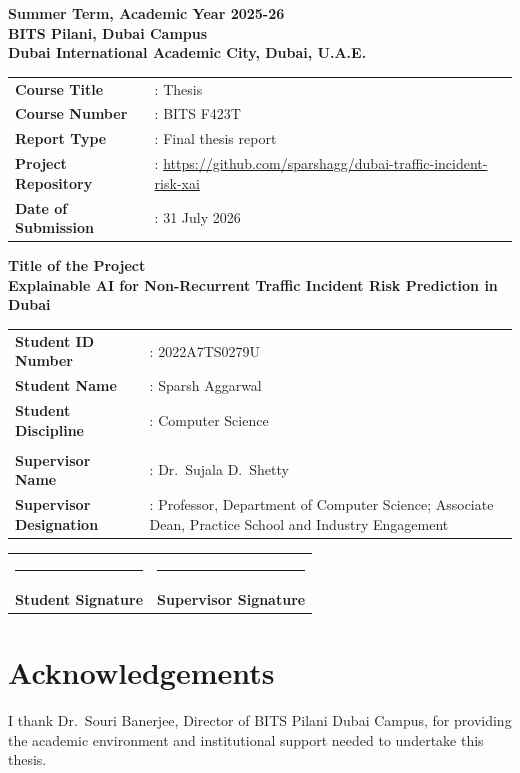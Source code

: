 \documentclass[12pt,a4paper]{report}
\newcommand{\thesistitle}{Explainable AI for Non-Recurrent Traffic Incident Risk Prediction in Dubai}
\newcommand{\studentname}{Sparsh Aggarwal}
\newcommand{\studentid}{2022A7TS0279U}
\newcommand{\studentdiscipline}{Computer Science}
\newcommand{\supervisor}{Dr.\ Sujala D.\ Shetty}
\newcommand{\supervisordesignation}{Professor, Department of Computer Science}
\newcommand{\supervisorsecondarydesignation}{Associate Dean, Practice School and Industry Engagement}
\newcommand{\director}{Dr.\ Souri Banerjee}
\newcommand{\publicrepo}{\url{https://github.com/sparshagg/dubai-traffic-incident-risk-xai}}
\begin{document}
\newpage
\thispagestyle{plain}
\begin{center}
    \large \textbf{Summer Term, Academic Year 2025-26}\\
    \textbf{BITS Pilani, Dubai Campus}\\
    \textbf{Dubai International Academic City, Dubai, U.A.E.}
\end{center}
\vspace{0.8cm}
\begin{tabular}{@{}ll}
    \textbf{Course Title} & : Thesis \\
    \textbf{Course Number} & : BITS F423T \\
    \textbf{Report Type} & : Final thesis report \\
    \textbf{Project Repository} & : \publicrepo \\
    \textbf{Date of Submission} & : 31 July 2026 \\
\end{tabular}
\vspace{1cm}
\begin{center}
    \textbf{Title of the Project}\\[0.2cm]
    \Large \textbf{\thesistitle}
\end{center}
\vspace{1.2cm}
\begin{tabularx}{\textwidth}{@{}L{0.32\textwidth}Y@{}}
    \textbf{Student ID Number} & : \studentid \\
    \textbf{Student Name} & : \studentname \\
    \textbf{Student Discipline} & : \studentdiscipline \\
    \\
    \textbf{Supervisor Name} & : \supervisor \\
    \textbf{Supervisor Designation} & : \supervisordesignation; \supervisorsecondarydesignation \\
\end{tabularx}

\vfill
\noindent
\begin{tabular}{p{} p{}}
    \rule{4cm}{0.4pt} & \rule{4cm}{0.4pt} \\
    \small \textbf{Student Signature} & \small \textbf{Supervisor Signature}
\end{tabular}

\chapter*{Acknowledgements}
I thank \director, Director of BITS Pilani Dubai Campus, for providing the academic environment and institutional support needed to undertake this thesis.
\end{document}
